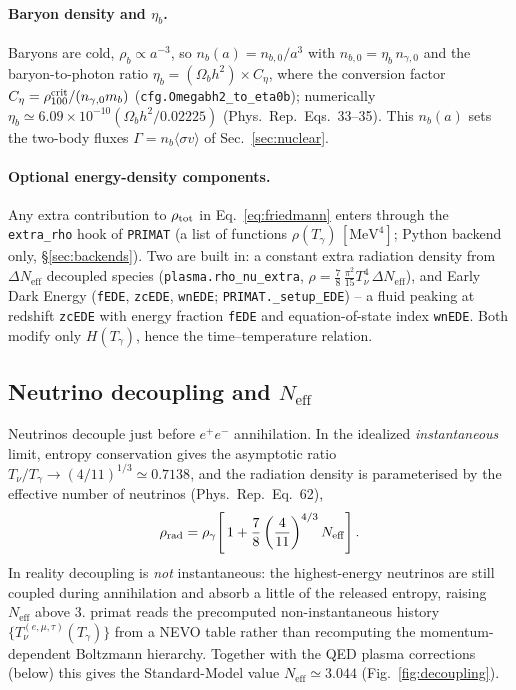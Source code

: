 \documentclass[11pt,a4paper]{article}
\newcommand{\Tg}{T_\gamma}
\newcommand{\Tnu}{T_\nu}
\newcommand{\Neff}{N_{\mathrm{eff}}}
\newcommand{\sigmav}{\langle\sigma v\rangle}
\newcommand{\code}[1]{\texttt{#1}}
\newcommand{\PR}{Phys.\ Rep.}
\begin{document}
\paragraph{Baryon density and $\eta_b$.}
Baryons are cold, $\rho_b\propto a^{-3}$, so $n_b(a)=n_{b,0}/a^3$ with
$n_{b,0}=\eta_b\,n_{\gamma,0}$ and the baryon-to-photon ratio
$\eta_b=(\Omega_bh^2)\times C_\eta$, where the conversion factor
$C_\eta=\rho^{\rm crit}_{100}/(n_{\gamma,0}m_b)$
(\code{cfg.Omegabh2\_to\_eta0b}); numerically $\eta_b\simeq6.09\times10^{-10}
(\Omega_bh^2/0.02225)$ (\PR\ Eqs.~33--35). This $n_b(a)$ sets the two-body
fluxes $\Gamma=n_b\sigmav$ of Sec.~\ref{sec:nuclear}.

\paragraph{Optional energy-density components.}
Any extra contribution to $\rho_{\rm tot}$ in Eq.~\eqref{eq:friedmann} enters
through the \code{extra\_rho} hook of \code{PRIMAT} (a list of functions
$\rho(\Tg)\,[\mathrm{MeV}^4]$; Python backend only, \S\ref{sec:backends}). Two
are built in: a constant extra radiation density from $\Delta\Neff$ decoupled
species (\code{plasma.rho\_nu\_extra},
$\rho=\tfrac78\,\tfrac{\pi^2}{15}\Tnu^4\,\Delta\Neff$), and Early Dark Energy
(\code{fEDE}, \code{zcEDE}, \code{wnEDE}; \code{PRIMAT.\_setup\_EDE}) -- a fluid
peaking at redshift \code{zcEDE} with energy fraction \code{fEDE} and
equation-of-state index \code{wnEDE}. Both modify only $H(\Tg)$, hence the
time--temperature relation.

\subsection{Neutrino decoupling and $\Neff$}
Neutrinos decouple just before $e^+e^-$ annihilation. In the idealized
\emph{instantaneous} limit, entropy conservation gives the asymptotic ratio
$\Tnu/\Tg \to (4/11)^{1/3}\simeq 0.7138$, and the radiation density is
parameterised by the effective number of neutrinos (\PR\ Eq.~62),
\begin{equation}
  \rho_{\rm rad} = \rho_\gamma\!\left[\,1
    + \frac{7}{8}\left(\frac{4}{11}\right)^{4/3}\Neff\right].
\label{eq:neff}
\end{equation}
In reality decoupling is \emph{not} instantaneous: the highest-energy neutrinos
are still coupled during annihilation and absorb a little of the released
entropy, raising $\Neff$ above 3. primat reads the precomputed
non-instantaneous history $\{\Tnu^{(e,\mu,\tau)}(\Tg)\}$ from a NEVO table rather
than recomputing the momentum-dependent Boltzmann hierarchy. Together with the
QED plasma corrections (below) this gives the Standard-Model value
$\Neff\simeq 3.044$ (Fig.~\ref{fig:decoupling}).
\end{document}
